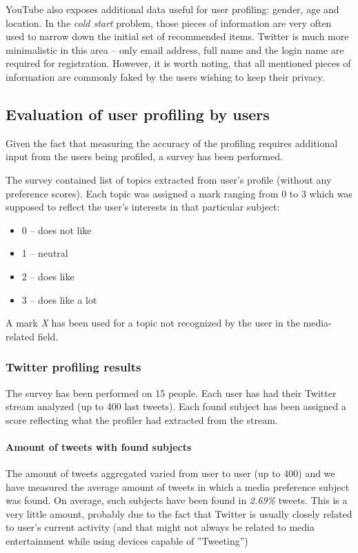 YouTube also exposes additional data useful for user profiling: gender, age and
location. In the \textit{cold start} problem, those pieces of information are very
often used to narrow down the initial set of recommended items. Twitter is much
more minimalistic in this area -- only email address, full name and the login
name are required for registration. However, it is worth noting, that all
mentioned pieces of information are commonly faked by the users wishing to keep
their privacy.

\subsection{Evaluation of user profiling by users}
Given the fact that measuring the accuracy of the profiling requires additional input
from the users being profiled, a survey has been performed.

The survey contained list of topics extracted from user's profile (without any preference scores).
Each topic was assigned a mark ranging from 0 to 3 which was supposed to reflect the user's interests
in that particular subject:
\begin{itemize}
\item 0 -- does not like
\item 1 -- neutral
\item 2 -- does like
\item 3 -- does like a lot
\end{itemize}
A mark \textit{X} has been used for a topic not recognized by the user in the media-related field.

\subsubsection{Twitter profiling results}

The survey has been performed on 15 people. Each user has had their Twitter stream analyzed
(up to 400 last tweets). Each found subject has been assigned a score reflecting what the profiler
had extracted from the stream.

\paragraph{Amount of tweets with found subjects}
The amount of tweets aggregated varied from user to user (up to 400) and we have measured the average amount
of tweets in which a media preference subject was found. On average, such subjects have been found in \textit{2.69\%}
tweets. This is a very little amount, probably due to the fact that Twitter is usually closely related to user's current
activity (and that might not always be related to media entertainment while using devices capable of ''Tweeting'')

